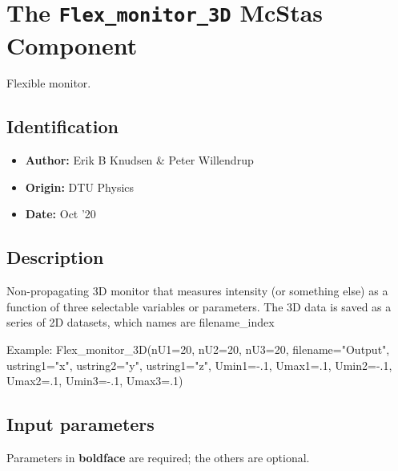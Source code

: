 \section{The \texttt{Flex\_monitor\_3D} McStas Component}
Flexible monitor.

\subsection*{Identification}
\begin{itemize}
  \item \textbf{Author:} Erik B Knudsen \& Peter Willendrup
  \item \textbf{Origin:} DTU Physics
  \item \textbf{Date:} Oct '20
\end{itemize}

\subsection*{Description}
Non-propagating 3D monitor that measures intensity (or something else) as a function of three selectable variables or parameters. The 3D data is saved as a series of 2D datasets, which names are filename\_index

Example: Flex\_monitor\_3D(nU1=20, nU2=20, nU3=20, filename="Output", ustring1="x", ustring2="y", ustring1="z", Umin1=-.1, Umax1=.1, Umin2=-.1, Umax2=.1, Umin3=-.1, Umax3=.1)

\subsection*{Input parameters}
Parameters in \textbf{boldface} are required; the others are optional.

